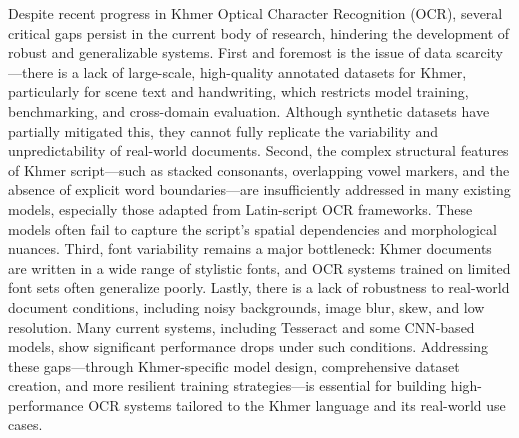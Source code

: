 Despite recent progress in Khmer Optical Character Recognition (OCR), 
several critical gaps persist in the current body of research, hindering the 
development of robust and generalizable systems. First and foremost is the issue of 
data scarcity—there is a lack of large-scale, high-quality annotated datasets for Khmer, 
particularly for scene text and handwriting, which restricts model training, benchmarking, 
and cross-domain evaluation. Although synthetic datasets have partially mitigated this, they 
cannot fully replicate the variability and unpredictability of real-world documents. Second, the 
complex structural features of Khmer script—such as stacked consonants, overlapping vowel markers, and 
the absence of explicit word boundaries—are insufficiently addressed in many existing models, 
especially those adapted from Latin-script OCR frameworks. These models often fail to 
capture the script's spatial dependencies and morphological nuances. Third, font 
variability remains a major bottleneck: Khmer documents are written in a wide range of stylistic 
fonts, and OCR systems trained on limited font sets often generalize poorly. Lastly, there is 
a lack of robustness to real-world document conditions, including noisy backgrounds, image blur, 
skew, and low resolution. Many current systems, including Tesseract and some CNN-based models, 
show significant performance drops under such conditions. Addressing these gaps—through 
Khmer-specific model design, comprehensive dataset creation, and more resilient training strategies—is 
essential for building high-performance OCR systems tailored to the Khmer language and its 
real-world use cases.